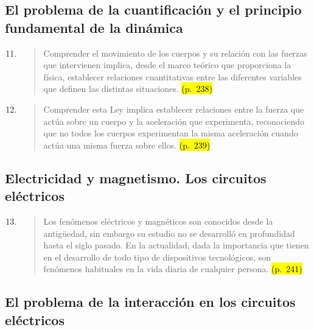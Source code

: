 \documentclass{article}
\begin{document}
\subsection*{El problema de la cuantificación y el principio fundamental de la dinámica}

\begin{enumerate}
  \setcounter{enumi}{10}
  \item
  \begin{quote}
  Comprender el movimiento de los cuerpos y su relación con las fuerzas que intervienen implica, desde el marco teórico que proporciona la física, establecer relaciones cuantitativas entre las diferentes variables que definen las distintas situaciones. \hl{(p.~238)}
  \end{quote}

  \item
  \begin{quote}
  Comprender esta Ley implica establecer relaciones entre la fuerza que actúa sobre un cuerpo y la aceleración que experimenta, reconociendo que no todos los cuerpos experimentan la misma aceleración cuando actúa una misma fuerza sobre ellos. \hl{(p.~239)}
  \end{quote}
\end{enumerate}

\subsection*{Electricidad y magnetismo. Los circuitos eléctricos}

\begin{enumerate}
  \setcounter{enumi}{12}
  \item
  \begin{quote}
  Los fenómenos eléctricos y magnéticos son conocidos desde la antigüedad, sin embargo su estudio no se desarrolló en profundidad hasta el siglo pasado. En la actualidad, dada la importancia que tienen en el desarrollo de todo tipo de dispositivos tecnológicos, son fenómenos habituales en la vida diaria de cualquier persona. \hl{(p.~241)}
  \end{quote}
\end{enumerate}

\subsection*{El problema de la interacción en los circuitos eléctricos}
\end{document}
